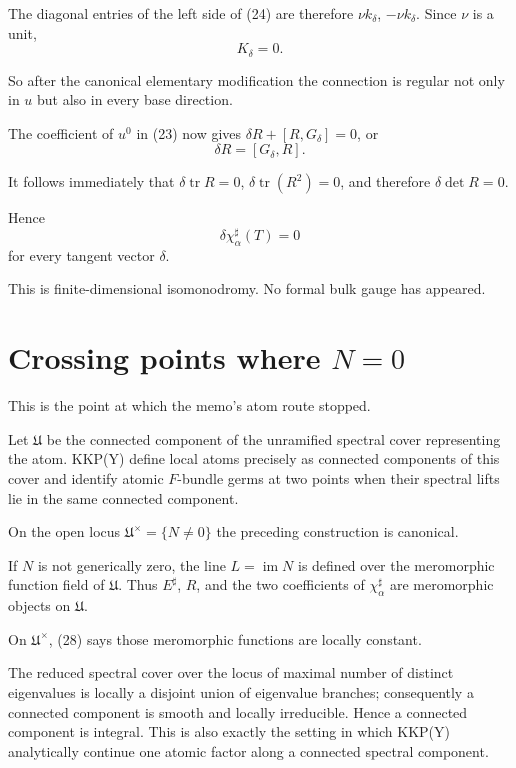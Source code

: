 \documentclass[11pt]{article}
\theoremstyle{definition}
\theoremstyle{remark}
\begin{document}
The diagonal entries of the left side of (24) are therefore $\nu k_\delta$,
$-\nu k_\delta$. Since $\nu$ is a unit,
\begin{equation}
  \boxed{\,K_\delta=0.\,}
  \tag{26}
\end{equation}

So after the canonical elementary modification the connection is regular not
only in $u$ but also in every base direction.

The coefficient of $u^0$ in (23) now gives $\delta R+[R,G_\delta]=0$, or
\begin{equation}
  \boxed{\,\delta R=[G_\delta,R].\,}
  \tag{27}
\end{equation}

It follows immediately that $\delta\operatorname{tr}R=0$,
$\delta\operatorname{tr}(R^2)=0$, and therefore $\delta\det R=0$.

Hence
\begin{equation}
  \boxed{\,\delta\chi^\sharp_\alpha(T)=0\,}
  \tag{28}
\end{equation}
for every tangent vector $\delta$.

This is finite-dimensional isomonodromy. No formal bulk gauge has appeared.

\section{Crossing points where $N=0$}

This is the point at which the memo's atom route stopped.

Let $\mathfrak U$ be the connected component of the unramified spectral cover
representing the atom. KKP(Y) define local atoms precisely as connected
components of this cover and identify atomic $F$-bundle germs at two points when
their spectral lifts lie in the same connected component.

On the open locus $\mathfrak U^\times=\{N\ne0\}$ the preceding construction is
canonical.

If $N$ is not generically zero, the line $L=\operatorname{im}N$ is defined over
the meromorphic function field of $\mathfrak U$. Thus $E^\sharp$, $R$, and the
two coefficients of $\chi^\sharp_\alpha$ are meromorphic objects on
$\mathfrak U$.

On $\mathfrak U^\times$, (28) says those meromorphic functions are locally
constant.

The reduced spectral cover over the locus of maximal number of distinct
eigenvalues is locally a disjoint union of eigenvalue branches; consequently a
connected component is smooth and locally irreducible. Hence a connected
component is integral. This is also exactly the setting in which KKP(Y)
analytically continue one atomic factor along a connected spectral component.
\end{document}

